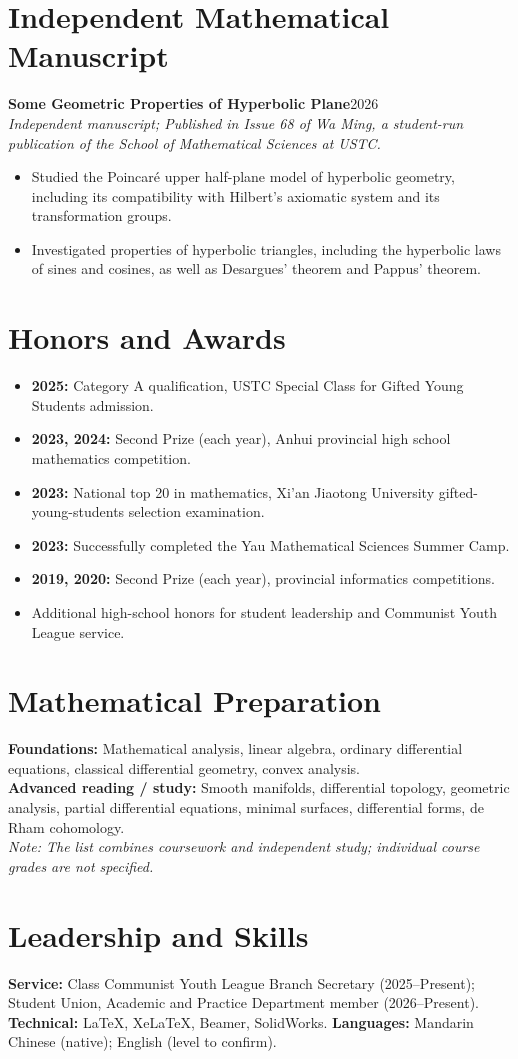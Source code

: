 \documentclass[10pt,a4paper]{article}
\begin{document}
\section*{Independent Mathematical Manuscript}
\textbf{Some Geometric Properties of Hyperbolic Plane}\hfill{\small 2026}\\
\emph{Independent manuscript; Published in Issue 68 of \textit{Wa Ming}, a student-run publication of the School of Mathematical Sciences at USTC.}
\begin{itemize}
\item Studied the Poincaré upper half-plane model of hyperbolic geometry, including its compatibility with Hilbert's axiomatic system and its transformation groups.
\item Investigated properties of hyperbolic triangles, including the hyperbolic laws of sines and cosines, as well as Desargues' theorem and Pappus' theorem.
\end{itemize}
\section*{Honors and Awards}
\begin{itemize}
\item \textbf{2025:} Category A qualification, USTC Special Class for Gifted Young Students admission.
\item \textbf{2023, 2024:} Second Prize (each year), Anhui provincial high school mathematics competition.
\item \textbf{2023:} National top 20 in mathematics, Xi'an Jiaotong University gifted-young-students selection examination.
\item \textbf{2023:} Successfully completed the Yau Mathematical Sciences Summer Camp.
\item \textbf{2019, 2020:} Second Prize (each year), provincial informatics competitions.
\item Additional high-school honors for student leadership and Communist Youth League service.
\end{itemize}
\section*{Mathematical Preparation}
\textbf{Foundations:} Mathematical analysis, linear algebra, ordinary differential equations, classical differential geometry, convex analysis.\\
\textbf{Advanced reading / study:} Smooth manifolds, differential topology, geometric analysis, partial differential equations, minimal surfaces, differential forms, de Rham cohomology.\\
\emph{Note: The list combines coursework and independent study; individual course grades are not specified.}
\section*{Leadership and Skills}
\textbf{Service:} Class Communist Youth League Branch Secretary (2025--Present); Student Union, Academic and Practice Department member (2026--Present).\\
\textbf{Technical:} LaTeX, XeLaTeX, Beamer, SolidWorks. \quad \textbf{Languages:} Mandarin Chinese (native); English (level to confirm).
\end{document}

